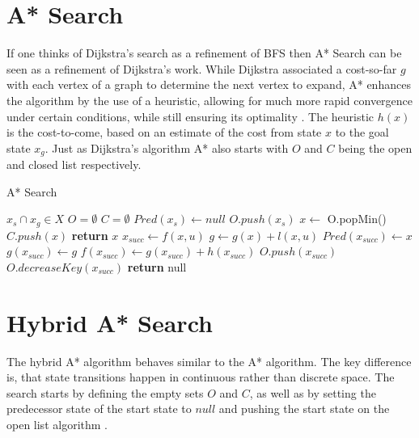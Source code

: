\section{A* Search}
If one thinks of Dijkstra's search as a refinement of BFS then A* Search can be seen as a refinement of Dijkstra's work. While Dijkstra associated a cost-so-far $g$ with each vertex of a graph to determine the next vertex to expand, A* enhances the algorithm by the use of a heuristic, allowing for much more rapid convergence under certain conditions, while still ensuring its optimality \cite{Hart.1968}. The heuristic $h(x)$ is the cost-to-come, based on an estimate of the cost from state $x$ to the goal state $x_g$. Just as Dijkstra's algorithm A* also starts with $O$ and $C$ being the open and closed list respectively.

\begin{algorithm}
    \caption{A* Search}\label{alg:A*}
    \begin{algorithmic}[1]
        \Require $x_s \cap x_g \in X$
        \State $O = \emptyset$
        \State $C = \emptyset$
        \State $Pred(x_s) \gets null$
        \State $O.push(x_s)$
            \State $x \gets$ O.popMin()
            \State $C.push(x)$
                \State \textbf{return} $x$
            \Else
                \State $x_{succ} \gets f(x,u)$
                        \State $g \gets g(x) + l(x,u)$
                            \State $Pred(x_{succ}) \gets x$
                            \State $g(x_{succ}) \gets g$
                            \State $f(x_{succ}) \gets g(x_{succ}) + h(x_{succ})$
                                \State $O.push(x_{succ})$
                            \Else
                                \State $O.decreaseKey(x_{succ})$
                            \EndIf
                        \EndIf
                    \EndIf
                \EndFor
            \EndIf
        \EndWhile
        \State \textbf{return} null
    \end{algorithmic}
\end{algorithm}

\newpage
\section{Hybrid A* Search}
The hybrid A* algorithm behaves similar to the A* algorithm. The key difference is, that state transitions happen in continuous rather than discrete space. The search starts by defining the empty sets $O$ and $C$, as well as by setting the predecessor state of the start state to $null$ and pushing the start state on the open list algorithm .

